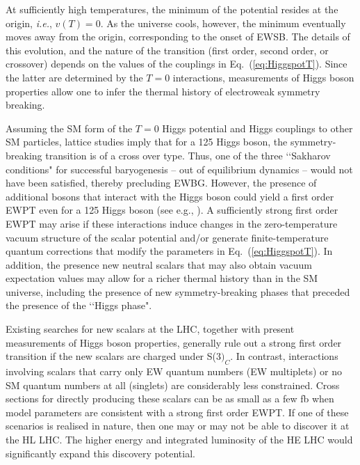At sufficiently high temperatures, the minimum of the potential resides at the origin, {\it i.e.}, $v(T) = 0$. As the universe cools, however, the minimum eventually moves away from the origin, corresponding to the onset of EWSB. The details of this evolution, and the nature of the transition (first order, second order, or crossover) depends on the values of the couplings in Eq.~(\ref{eq:HiggspotT}). Since the latter are determined by the $T=0$ interactions, measurements of Higgs boson properties allow one to infer the thermal history of electroweak symmetry breaking. 

Assuming the SM form of the $T=0$ Higgs potential and Higgs couplings to other SM particles, lattice studies imply that for a 125 \UGeV Higgs boson, the symmetry-breaking transition is of a cross over type\cite{Rummukainen:1998as,Csikor:1998eu,Laine:1998jb,Gurtler:1997hr}. Thus, one of the three \lq\lq Sakharov conditions" for successful baryogenesis\cite{Sakharov:1967dj} -- out of equilibrium dynamics -- would not have been satisfied, thereby precluding EWBG. However, the presence of additional bosons that interact with the Higgs boson could yield a first order EWPT even for a 125 \UGeV Higgs boson (see e.g., \cite{Morrissey:2012db,Assamagan:2016azc}). A sufficiently strong first order EWPT may arise if these interactions induce changes in the zero-temperature vacuum structure of the scalar potential and/or generate finite-temperature quantum corrections that modify the parameters in Eq.~(\eqref{eq:HiggspotT}). In addition, the presence new neutral scalars that may also obtain vacuum expectation values may allow for a richer thermal history than in the SM universe, including the presence of new symmetry-breaking phases that preceded the presence of the \lq\lq Higgs phase"\cite{Patel:2012pi,Patel:2013zla,Blinov:2015sna,Ramsey-Musolf:2017tgh}. 

 Existing searches for new scalars at the LHC, together with present measurements of Higgs boson properties, generally rule out a strong first order transition if the new scalars are charged under S(3$)_C$\cite{Katz:2014bha,Katz:2015uja}. In contrast, interactions involving scalars that carry only EW quantum numbers (EW multiplets) or no SM quantum numbers at all (singlets) are considerably less constrained. Cross sections for directly producing these scalars can be as small as a few fb when model parameters are consistent with a strong first order EWPT. If one of these scenarios is realised in nature, then one may or may not be able to discover it at the HL LHC. The higher energy and integrated luminosity of the HE LHC would significantly expand this discovery potential. 

